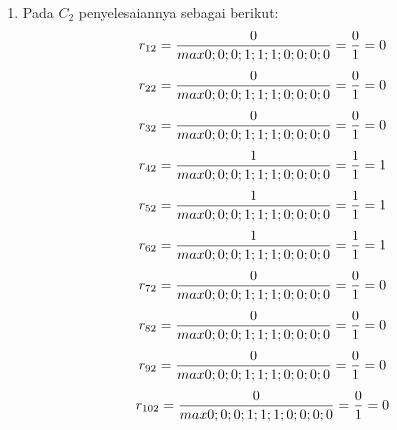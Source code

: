 \documentclass[a4paper,twoside]{article}
\begin{document}
\begin{enumerate}
\begin{enumerate}
\item Pada $C_{2}$ penyelesaiannya sebagai berikut:
\begin{displaymath}
r_{12} = \frac{0}{max {0;0;0;1;1;1;0;0;0;0}} = \frac{0}{1} = 0\\
\end {displaymath}
\begin{displaymath}
r_{22} = \frac{0}{max {0;0;0;1;1;1;0;0;0;0}} = \frac{0}{1} = 0\\
\end{displaymath}
\begin{displaymath}
r_{32} = \frac{0}{max {0;0;0;1;1;1;0;0;0;0}} = \frac{0}{1} = 0\\
\end {displaymath}
\begin{displaymath}
r_{42} = \frac{1}{max {0;0;0;1;1;1;0;0;0;0}} = \frac{1}{1} = 1\\
\end {displaymath}
\begin{displaymath}
r_{52} = \frac{1}{max {0;0;0;1;1;1;0;0;0;0}} = \frac{1}{1} = 1\\
\end {displaymath}
\begin{displaymath}
r_{62} = \frac{1}{max {0;0;0;1;1;1;0;0;0;0}} = \frac{1}{1} = 1\\
\end {displaymath}
\begin{displaymath}
r_{72} = \frac{0}{max {0;0;0;1;1;1;0;0;0;0}} = \frac{0}{1} = 0\\
\end {displaymath}
\begin{displaymath}
r_{82} = \frac{0}{max {0;0;0;1;1;1;0;0;0;0}} = \frac{0}{1} = 0\\
\end {displaymath}
\begin{displaymath}
r_{92} = \frac{0}{max {0;0;0;1;1;1;0;0;0;0}} = \frac{0}{1} = 0\\
\end {displaymath}
\begin{displaymath}
r_{102} = \frac{0}{max {0;0;0;1;1;1;0;0;0;0}} = \frac{0}{1} = 0\\
\end {displaymath}


\end{enumerate}
\end{enumerate}
\end{document}

